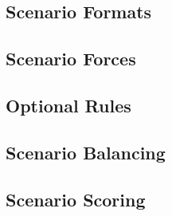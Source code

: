 

\subsection{Scenario Formats}



\subsection{Scenario Forces}



\newpage

\subsection{Optional Rules}



\subsection{Scenario Balancing}



\subsection{Scenario Scoring}



\newpage

